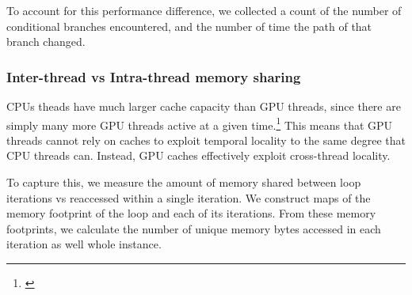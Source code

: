 \documentclass[12pt,twoside]{reedthesis}
\begin{document}
		To account for this performance difference, we collected a count of the number of conditional branches encountered, and the number of time the path of that branch changed. 
		
		\subsubsection{Inter-thread vs Intra-thread memory sharing}
		
		CPUs theads have much larger cache capacity than GPU threads, since there are simply many more GPU threads active at a given time.\footnote{\cite{Jia:6835938}} This means that GPU threads cannot rely on caches to exploit temporal locality to the same degree that CPU threads can. Instead, GPU caches effectively exploit cross-thread locality. 
		
		To capture this, we measure the amount of memory shared between loop iterations vs reaccessed within a single iteration.
		We construct maps of the memory footprint of the loop and each of its iterations. From these memory footprints, we calculate the number of unique memory bytes accessed in each iteration as well whole instance. %
		
%		
%		
%		
%		
%		
%		
%		
%		
%		
%		
%		
%		
%
\end{document}
